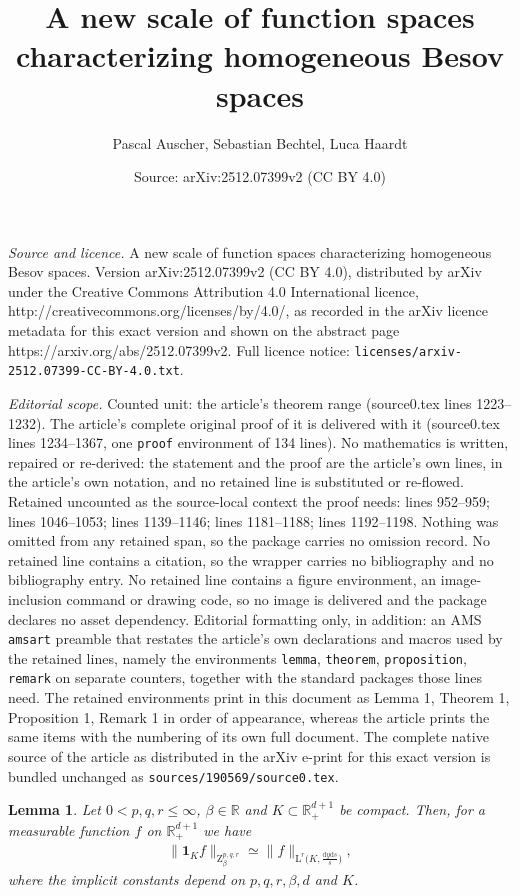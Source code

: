 \documentclass[10pt,a4paper]{amsart}
\title{A new scale of function spaces characterizing homogeneous Besov spaces}
\author{Pascal Auscher, Sebastian Bechtel, Luca Haardt}
\date{Source: arXiv:2512.07399v2 (CC BY 4.0)}
\newtheorem{lemma}{Lemma}
\newcommand{\IR}{\mathbb{R}}
\renewcommand{\L}{\mathrm{L}}
\newcommand{\Z}{\mathrm{Z}}
\renewcommand{\d}{\mathrm{d}}
\begin{document}
\maketitle

\noindent\emph{Source and licence.} A new scale of function spaces characterizing homogeneous Besov spaces. Version arXiv:2512.07399v2 (CC BY 4.0), distributed by arXiv under the Creative Commons Attribution 4.0 International licence, http://creativecommons.org/licenses/by/4.0/, as recorded in the arXiv licence metadata for this exact version and shown on the abstract page https://arxiv.org/abs/2512.07399v2. Full licence notice: \texttt{licenses/arxiv-2512.07399-CC-BY-4.0.txt}.\par\smallskip

\noindent\textit{Editorial scope.} Counted unit: the article's theorem range (source0.tex lines 1223--1232). The article's complete original proof of it is delivered with it (source0.tex lines 1234--1367, one \texttt{proof} environment of 134 lines). No mathematics is written, repaired or re-derived: the statement and the proof are the article's own lines, in the article's own notation, and no retained line is substituted or re-flowed.  Retained uncounted as the source-local context the proof needs: lines 952--959; lines 1046--1053; lines 1139--1146; lines 1181--1188; lines 1192--1198.  Nothing was omitted from any retained span, so the package carries no omission record.  No retained line contains a citation, so the wrapper carries no bibliography and no bibliography entry.  No retained line contains a figure environment, an image-inclusion command or drawing code, so no image is delivered and the package declares no asset dependency.  Editorial formatting only, in addition: an AMS \texttt{amsart} preamble that restates the article's own declarations and macros used by the retained lines, namely the environments \texttt{lemma}, \texttt{theorem}, \texttt{proposition}, \texttt{remark} on separate counters, together with the standard packages those lines need.  The retained environments print in this document as Lemma 1, Theorem 1, Proposition 1, Remark 1 in order of appearance, whereas the article prints the same items with the numbering of its own full document.  The complete native source of the article as distributed in the arXiv e-print for this exact version is bundled unchanged as \texttt{sources/190569/source0.tex}.
\begin{lemma}
\label{lem: compare Z with Lr}
    Let $0<p,q,r\leq \infty$, $\beta\in \IR$ and $K\subset \IR^{d+1}_+$ be compact. Then, for a measurable function $f$ on $\IR^{d+1}_+$ we have
    \begin{align*}
        \|\mathbf{1}_K f \|_{\Z^{p,q,r}_\beta} \simeq \|f\|_{\L^{r}\big(K,\frac{\d y \d s}{s}\big)},
    \end{align*}
    where the implicit constants depend on $p,q,r,\beta,d$ and $K$.
\end{lemma}
\end{document}
